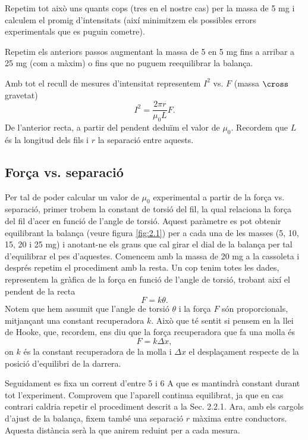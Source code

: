 \documentclass[a4paper,10.5pt]{report}
\begin{document}
Repetim tot això uns quants cops (tres en el nostre cas) per la massa de 5 mg i calculem el promig d'intensitats (així minimitzem els possibles errors experimentals que es puguin cometre).

Repetim els anteriors passos augmentant la massa de 5 en 5 mg fins a arribar a 25 mg (com a màxim) o fins que no puguem reequilibrar la balança.

Amb tot el recull de mesures d'intensitat representem $I^2$ vs. $F$ (massa $\cross$ gravetat)
\begin{equation}
	I^2 = \frac{2\pi r}{\mu_0 L} F. \label{eq:2.9}
\end{equation}
De l'anterior recta, a partir del pendent deduïm el valor de $\mu_0$. Recordem que $L$ és la longitud dels fils i $r$ la separació entre aquests.

\subsection{Força vs. separació}
Per tal de poder calcular un valor de $\mu_0$ experimental a partir de la força vs. separació, primer trobem la constant de torsió del fil, la qual relaciona la força del fil d'acer en funció de l'angle de torsió. Aquest paràmetre es pot obtenir equilibrant la balança (veure figura \ref{fig:2.1}) per a cada una de les masses (5, 10, 15, 20 i 25 mg) i anotant-ne els graus que cal girar el dial de la balança per tal d'equilibrar el pes d'aquestes. Comencem amb la massa de 20 mg a la cassoleta i després repetim el procediment amb la resta. Un cop tenim totes les dades, representem la gràfica de la força en funció de l'angle de torsió, trobant així el pendent de la recta 
\begin{equation}
	F=k\theta.
	\label{eq2:10}
\end{equation}
Notem que hem assumit que l'angle de torsió $\theta$ i la força $F$ són proporcionals, mitjançant una constant recuperadora $k$. Això que té sentit si pensem en la llei de Hooke, que, recordem, ens diu que la força recuperadora que fa una molla és
\begin{equation}
	F = k\Delta x,
\end{equation} 
on $k$ és la constant recuperadora de la molla i $\Delta x$ el desplaçament respecte de la posició d'equilibri de la darrera.

Seguidament es fixa un corrent d'entre 5 i 6 A que es mantindrà constant durant tot l'experiment. Comprovem que l'aparell continua equilibrat, ja que en cas contrari caldria repetir el procediment descrit a la Sec. 2.2.1. Ara, amb els cargols d'ajust de la balança, fixem també una separació $r$ màxima entre conductors. Aquesta distància serà la que anirem reduint per a cada mesura.
\end{document}
